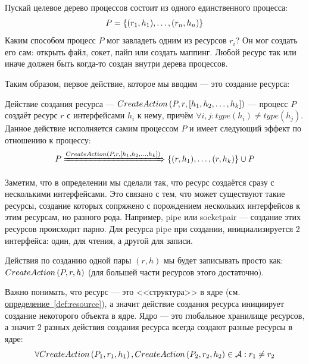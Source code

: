 Пускай целевое дерево процессов состоит из одного единственного процесса: 
\begin{equation*}
P = \left\lbrace (r_1, h_1), \ldots, (r_n, h_n) \right\rbrace
\end{equation*}
Каким способом процесс $P$ мог завладеть одним из ресурсов $r_i$? Он мог создать его сам: открыть файл, сокет, пайп или создать маппинг. Любой ресурс так или иначе должен быть когда-то создан внутри дерева процессов.

Таким образом, первое действие, которое мы вводим --- это создание ресурса:

\begin{defn}
\label{def:createact}
Действие создания ресурса --- $CreateAction\left( P, r, \left[ h_1, h_2, \ldots, h_k \right] \right)$ --- процесс $P$ создаёт ресурс $r$ с интерфейсами $h_i$ к нему, причём $\forall{i, j}: type(h_i) \neq type(h_j)$. Данное действие исполняется самим процессом $P$ и имеет следующий эффект по отношению к процессу:
\begin{equation*}
	P \xRightarrow{CreateAction\left( P, r, \left[ h_1, h_2, \ldots, h_k \right] \right)} \left\lbrace (r, h_1), \ldots, (r, h_k) \right\rbrace \cup P
\end{equation*}
\end{defn}

\begin{note}
Заметим, что в определении мы сделали так, что ресурс создаётся сразу с несколькими интерфейсами. Это связано с тем, что может существуют такие ресурсы, создание которых сопряжено с порождением нескольких интерфейсов к этим ресурсам, но разного рода. Например, pipe или socketpair --- создание этих ресурсов происходит парно. Для ресурса pipe при создании, инициализируется 2 интерфейса: один, для чтения, а другой для записи.

Действия по созданию одной пары $(r, h)$ мы будет записывать просто как: $CreateAction\left( P, r, h \right)$ (для большей части ресурсов этого достаточно).
\end{note}

\begin{note}
Важно понимать, что ресурс --- это <<структура>> в ядре (см. \hyperref[def:resource]{определение~\ref*{def:resource}}), а значит действие создания ресурса инициирует создание некоторого объекта в ядре. Ядро --- это глобальное хранилище ресурсов, а значит 2 разных действия создания ресурса всегда создают разные ресурсы в ядре:
\begin{equation*}
	\forall CreateAction\left( P_1, r_1, h_1 \right), CreateAction\left( P_2, r_2, h_2 \right) \in \mathcal{A}: r_1 \neq r_2
\end{equation*}
\end{note}

